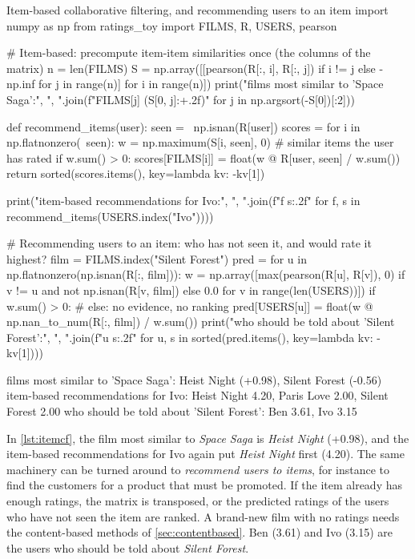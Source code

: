 \begin{pylisting}[label={lst:itemcf}]{Item-based collaborative filtering, and recommending users to an item}
import numpy as np
from ratings_toy import FILMS, R, USERS, pearson

# Item-based: precompute item-item similarities once (the columns of the matrix)
n = len(FILMS)
S = np.array([[pearson(R[:, i], R[:, j]) if i != j else -np.inf for j in range(n)]
              for i in range(n)])
print("films most similar to 'Space Saga':",
      ", ".join(f"{FILMS[j]} ({S[0, j]:+.2f})" for j in np.argsort(-S[0])[:2]))

def recommend_items(user):
    seen = ~np.isnan(R[user])
    scores = {}
    for i in np.flatnonzero(~seen):
        w = np.maximum(S[i, seen], 0)                  # similar items the user has rated
        if w.sum() > 0:
            scores[FILMS[i]] = float(w @ R[user, seen] / w.sum())
    return sorted(scores.items(), key=lambda kv: -kv[1])

print("item-based recommendations for Ivo:",
      ", ".join(f"{f} {s:.2f}" for f, s in recommend_items(USERS.index("Ivo"))))

# Recommending users to an item: who has not seen it, and would rate it highest?
film = FILMS.index("Silent Forest")
pred = {}
for u in np.flatnonzero(np.isnan(R[:, film])):
    w = np.array([max(pearson(R[u], R[v]), 0) if v != u and not np.isnan(R[v, film])
                  else 0.0 for v in range(len(USERS))])
    if w.sum() > 0:                                    # else: no evidence, no ranking
        pred[USERS[u]] = float(w @ np.nan_to_num(R[:, film]) / w.sum())
print("who should be told about 'Silent Forest':",
      ", ".join(f"{u} {s:.2f}" for u, s in sorted(pred.items(), key=lambda kv: -kv[1])))
\end{pylisting}
\begin{pyoutput}
films most similar to 'Space Saga': Heist Night (+0.98), Silent Forest (-0.56)
item-based recommendations for Ivo: Heist Night 4.20, Paris Love 2.00, Silent Forest 2.00
who should be told about 'Silent Forest': Ben 3.61, Ivo 3.15
\end{pyoutput}

In \cref{lst:itemcf}, the film most similar to \emph{Space Saga} is \emph{Heist Night} (+0.98), and the item-based
recommendations for Ivo again put \emph{Heist Night} first (4.20). The same machinery can be turned around to
\emph{recommend users to items}, for instance to find the customers for a product that must be promoted. If the item already has enough ratings, the matrix is transposed, or the predicted ratings of the users who have not seen the item are ranked. A brand-new film with no ratings needs the content-based methods of \cref{sec:contentbased}. Ben (3.61) and Ivo (3.15) are the
users who should be told about \emph{Silent Forest}.

